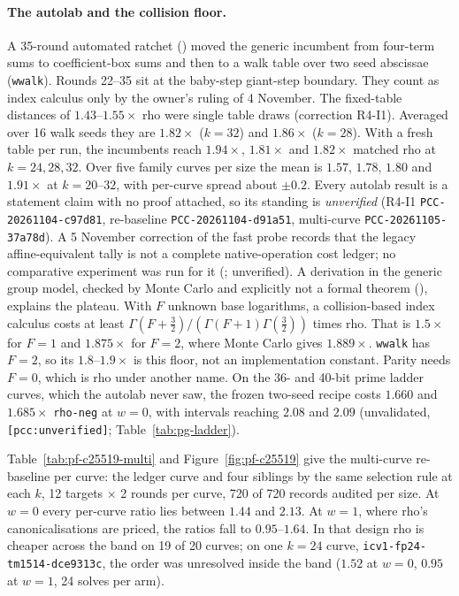 \paragraph{The autolab and the collision floor.} A 35-round automated
ratchet () moved the generic
incumbent from four-term sums to coefficient-box sums and then to a walk
table over two seed abscissae (\texttt{wwalk}). Rounds 22--35 sit at the
baby-step giant-step boundary. They count as index calculus only by the
owner's ruling of 4 November. The fixed-table distances of $1.43$--$1.55\times$
rho were single table draws (correction R4-I1). Averaged over 16 walk seeds
they are $1.82\times$ ($k=32$) and $1.86\times$ ($k=28$). With a fresh table
per run, the incumbents reach $1.94\times$, $1.81\times$ and $1.82\times$
matched rho at $k=24,28,32$. Over five family curves per size the mean is
$1.57$, $1.78$, $1.80$ and $1.91\times$ at $k=20$--$32$, with per-curve
spread about $\pm0.2$. Every autolab result is a statement claim with no
proof attached, so its standing is \emph{unverified} (R4-I1
\texttt{PCC-20261104-c97d81}, re-baseline \texttt{PCC-20261104-d91a51},
multi-curve \texttt{PCC-20261105-37a78d}). A 5 November correction of the
fast probe records that the legacy affine-equivalent tally is not a complete
native-operation cost ledger; no comparative experiment was run for it
(; unverified). A derivation in the
generic group model, checked by Monte Carlo and explicitly not a formal
theorem (), explains
the plateau. With $F$ unknown base logarithms, a collision-based index
calculus costs at least
$\Gamma(F+\tfrac32)/(\Gamma(F+1)\Gamma(\tfrac32))$ times rho. That is
$1.5\times$ for $F=1$ and $1.875\times$ for $F=2$, where Monte Carlo
gives $1.889\times$. \texttt{wwalk} has $F=2$, so its $1.8$--$1.9\times$
is this floor, not an implementation constant. Parity needs $F=0$, which
is rho under another name. On the 36- and 40-bit prime ladder curves, which the autolab never
saw, the frozen two-seed recipe costs $1.660$ and $1.685\times$
\texttt{rho-neg} at $w=0$, with intervals reaching $2.08$ and $2.09$
(unvalidated, \texttt{[pcc:unverified]}; Table~\ref{tab:pg-ladder}).

Table~\ref{tab:pf-c25519-multi} and Figure~\ref{fig:pf-c25519} give the
multi-curve re-baseline per curve: the ledger curve and four siblings by
the same selection rule at each $k$, 12 targets $\times$ 2 rounds per
curve, 720 of 720 records audited per size. At $w=0$ every per-curve
ratio lies between $1.44$ and $2.13$. At $w=1$, where rho's
canonicalisations are priced, the ratios fall to $0.95$--$1.64$. In that
design rho is cheaper across the band on 19 of 20 curves; on one $k=24$
curve, \texttt{icv1-fp24-tm1514-dce9313c}, the order was unresolved inside
the band ($1.52$ at $w=0$, $0.95$ at $w=1$, 24 solves per arm).

